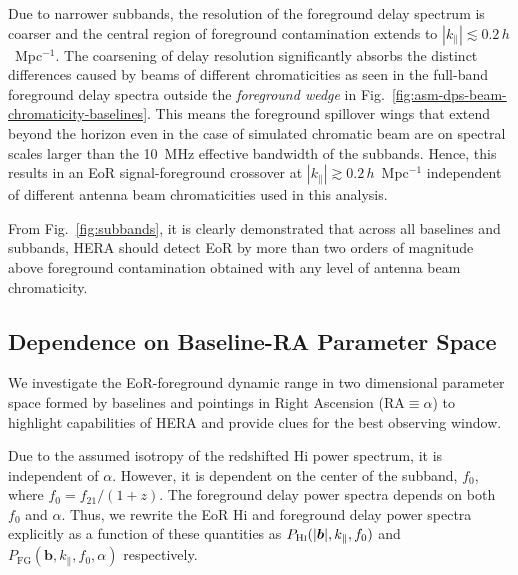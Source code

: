 \documentclass[preprint2,iop,numberedappendix,twocolappendix,appendixfloats]{emulateapj}
\begin{document}
Due to narrower subbands, the resolution of the foreground delay spectrum is coarser and the central region of foreground contamination extends to $|k_\parallel| \lesssim 0.2\,h$~Mpc$^{-1}$. The coarsening of delay resolution significantly absorbs the distinct differences caused by beams of different chromaticities as seen in the full-band foreground delay spectra outside the {\it foreground wedge} in Fig.~\ref{fig:asm-dps-beam-chromaticity-baselines}. This means the foreground spillover wings that extend beyond the horizon even in the case of simulated chromatic beam are on spectral scales larger than the 10~MHz effective bandwidth of the subbands. Hence, this results in an EoR signal-foreground crossover at $|k_\parallel| \gtrsim 0.2\,h$~Mpc$^{-1}$ independent of different antenna beam chromaticities used in this analysis. 

From Fig.~\ref{fig:subbands}, it is clearly demonstrated that across all baselines and subbands, HERA should detect EoR by more than two orders of magnitude above foreground contamination obtained with any level of antenna beam chromaticity. %

\subsection{Dependence on Baseline-RA Parameter Space}\label{sec:baseline-RA}

We investigate the EoR-foreground dynamic range in two dimensional parameter space formed by baselines and pointings in Right Ascension (RA$\equiv\alpha$) to highlight capabilities of HERA and provide clues for the best observing window. 

Due to the assumed isotropy of the redshifted H{\sc i} power spectrum, it is independent of $\alpha$. However, it is dependent on the center of the subband, $f_0$, where $f_0 = f_{21}/(1+z)$. The foreground delay power spectra depends on both $f_0$ and $\alpha$. Thus, we rewrite the EoR H{\sc i} and foreground delay power spectra explicitly as a function of these quantities as $P_\textrm{H{\sc i}}(|\boldsymbol{b}|,k_\parallel,f_0)$ and $P_\textrm{FG}(\boldsymbol{b},k_\parallel,f_0,\alpha)$ respectively.
\end{document}
